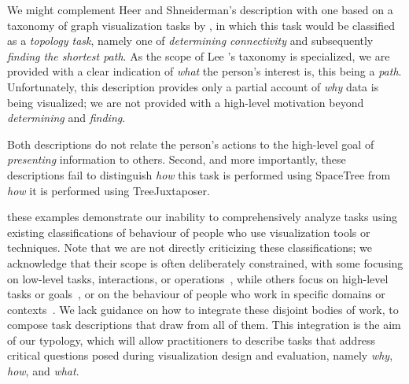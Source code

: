 We might complement Heer and Shneiderman's description with one based on a taxonomy of graph visualization tasks by \citet{Lee2006}, in which this task would be classified as a {\it topology task}, namely one of {\it determining connectivity} and subsequently {\it finding the shortest path}.
As the scope of Lee \etal's taxonomy is specialized, we are provided with a clear indication of {\it what} the person's interest is, this being a {\it path}.
Unfortunately, this description provides only a partial account of {\it why} data is being visualized; we are not provided with a high-level motivation beyond {\it determining} and {\it finding}.

Both descriptions do not relate the person's actions to the high-level goal of {\it presenting} information to others.
Second, and more importantly, these descriptions fail to distinguish {\it how} this task is performed using SpaceTree from {\it how} it is performed using TreeJuxtaposer.

 these examples demonstrate our inability to comprehensively analyze tasks using existing classifications of behaviour of people who use visualization tools or techniques.
Note that we are not directly criticizing these classifications; we acknowledge that their scope is often deliberately constrained, with some focusing on low-level tasks, interactions, or operations~\cite{Amar2005,Andrienko2006,Buja1996,Casner1991,Chi1998,Chuah1996,Dix1998,Gotz2008,Keim2002,Lee2006,Roth1990,Shneiderman1996,Tweedie1997,Valiati2006,Ward2004,Wehrend1990,Yi2007,Zhou1998}, while others focus on high-level tasks or goals~\cite{Amar2004,Card1999,Klein2006,Liu2010,Pirolli2005}, or on the behaviour of people who work in specific domains or contexts~\cite{Lee2006,Roth2012,Roth2013,Sprague2012}.
We lack guidance on how to integrate these disjoint bodies of work, to compose task descriptions that draw from all of them.
This integration is the aim of our typology, which will allow practitioners to describe tasks that address critical questions posed during visualization design and evaluation, namely {\it why}, {\it how}, and {\it what}.


